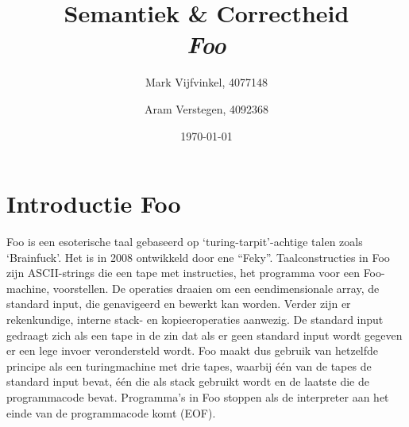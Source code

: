 \documentclass[11pt]{article}
\title{\textbf{Semantiek \& Correctheid \\ \emph{Foo}}}
\author{
	Mark Vijfvinkel, 4077148
	\and Aram Verstegen, 4092368
}
\date{\today}
\begin{document}
\maketitle


\section{Introductie Foo}

Foo is een esoterische taal gebaseerd op `turing-tarpit'-achtige talen zoals `Brainfuck'. Het is in 2008 ontwikkeld door ene ``Feky''.
Taalconstructies in Foo zijn ASCII-strings die een tape met instructies, het programma voor een Foo-machine, voorstellen.
De operaties draaien om een eendimensionale array, de standard input, die genavigeerd en bewerkt kan worden.
Verder zijn er rekenkundige, interne stack- en kopieeroperaties aanwezig.
De standard input gedraagt zich als een tape in de zin dat als er geen standard input wordt gegeven er een lege invoer verondersteld wordt. 
Foo maakt dus gebruik van hetzelfde principe als een turingmachine met drie tapes, waarbij \'e\'en van de tapes de standard input bevat, \'e\'en die als stack gebruikt wordt en de laatste die de programmacode bevat. %
Programma's in Foo stoppen als de interpreter aan het einde van de programmacode komt (EOF).
\end{document}

